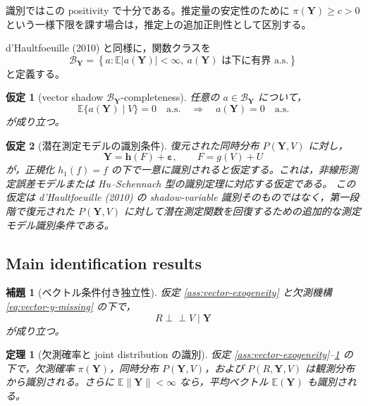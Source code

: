 \documentclass[10pt,a4paper]{article}
\newtheorem{assumption}{仮定}
\newtheorem{theorem}{定理}
\newtheorem{lemma}{補題}
\newcommand{\indep}{\mathrel{\perp\!\!\!\perp}}
\newcommand{\E}{\mathbb{E}}
\newcommand{\1}{\mathbf{1}}
\newcommand{\Y}{\bm{Y}}
\newcommand{\eps}{\bm{\varepsilon}}
\begin{document}
識別ではこの positivity で十分である。推定量の安定性のために
$\pi(\Y)\geq c>0$ という一様下限を課す場合は，推定上の追加正則性として区別する。

d'Haultfoeuille (2010) と同様に，関数クラスを
\begin{equation}
  \mathcal B_{\Y}
  =\left\{a:\E|a(\Y)|<\infty,\
  a(\Y)\text{ は下に有界 a.s.}\right\}
  \label{eq:vector-admissible-class}
\end{equation}
と定義する。

\begin{assumption}[vector shadow $\mathcal B_{\Y}$-completeness]
\label{ass:vector-completeness}
任意の $a\in\mathcal B_{\Y}$ について，
\begin{equation}
  \E\{a(\Y)\mid V\}=0\quad \mathrm{a.s.}
  \quad\Longrightarrow\quad
  a(\Y)=0\quad \mathrm{a.s.}
  \label{eq:vector-completeness}
\end{equation}
が成り立つ。
\end{assumption}

\begin{assumption}[潜在測定モデルの識別条件]
\label{ass:vector-latent-identification}
復元された同時分布 $P(\Y,V)$ に対し，
\begin{equation}
  \Y=\bm h(F)+\eps,
  \qquad
  F=g(V)+U
  \label{eq:vector-latent-id}
\end{equation}
が，正規化 $h_1(f)=f$ の下で一意に識別されると仮定する。これは，非線形測定誤差モデルまたは Hu--Schennach 型の識別定理に対応する仮定である。
この仮定は d'Haultfoeuille (2010) の shadow-variable 識別そのものではなく，第一段階で復元された $P(\Y,V)$ に対して潜在測定関数を回復するための追加的な測定モデル識別条件である。
\end{assumption}

\subsection{Main identification results}

\begin{lemma}[ベクトル条件付き独立性]
\label{lem:vector-shadow-independence}
仮定 \ref{ass:vector-exogeneity} と欠測機構 \eqref{eq:vector-y-missing} の下で，
\begin{equation}
  R\indep V\mid \Y
  \label{eq:vector-shadow-independence}
\end{equation}
が成り立つ。
\end{lemma}

\begin{theorem}[欠測確率と joint distribution の識別]
\label{thm:vector-shadow-identification}
仮定 \ref{ass:vector-exogeneity}--\ref{ass:vector-completeness} の下で，欠測確率 $\pi(\Y)$，同時分布 $P(\Y,V)$，および $P(R,\Y,V)$ は観測分布から識別される。さらに $\E\|\Y\|<\infty$ なら，平均ベクトル $\E(\Y)$ も識別される。
\end{theorem}
\end{document}
